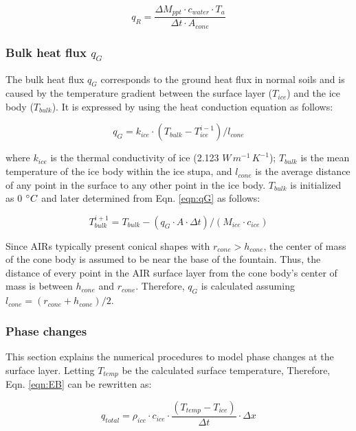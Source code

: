 \begin{equation}
	q_{R} = \frac{ \Delta M_{ppt} \cdot c_{water} \cdot T_a}{\Delta t \cdot A_{cone}}
	\label{eqn:qR}
\end{equation}

\subsubsection{Bulk heat flux \texorpdfstring{$q_{G}$}{Lg}} \label{sec:Bulkflux}

The bulk heat flux $q_{G}$ corresponds to the ground heat flux in normal soils and is caused by the
temperature gradient between the surface layer ($T_{ice}$) and the ice body ($T_{bulk}$). It is expressed by
using the heat conduction equation as follows:

\begin{equation} q_{G} = k_{ice} \cdot (T_{bulk}-T_{ice}^{i-1})/l_{cone} \label{eqn:qG}    \end{equation}

where $k_{ice}$ is the thermal conductivity of ice (2.123 $W\, m^{-1}\,K^{-1}$); $T_{bulk}$ is the mean
temperature of the ice body within the ice stupa, and $l_{cone}$ is the average distance of any point in the
surface to any other point in the ice body. $T_{bulk}$ is initialized as 0 $^{\circ} C$ and later determined from
Eqn. \ref{eqn:qG} as follows:

\begin{equation} T_{bulk}^{i+1} = T_{bulk} - (q_{G} \cdot A \cdot \Delta t)/(M_{ice} \cdot c_{ice}) \end{equation}

Since \ac{AIRs} typically present conical shapes with $r_{cone} > h_{cone}$, the center of mass of the cone body is
assumed to be near the base of the fountain. Thus, the distance of every point in the AIR surface layer from the
cone body's center of mass is between $h_{cone}$ and $r_{cone}$. Therefore, $q_{G}$ is calculated assuming
$l_{cone} = (r_{cone} + h_{cone})/2$.

\subsubsection{Phase changes}\label{sec:phase}

This section explains the numerical procedures to model phase changes at the surface layer. Letting
$T_{temp}$ be the calculated surface temperature, Therefore, Eqn. \ref{eqn:EB} can be rewritten as:

$$q_{total} =\rho_{ice} \cdot c_{ice} \cdot \frac{(T_{temp}-T_{ice})}{\Delta t} \cdot \Delta x$$

